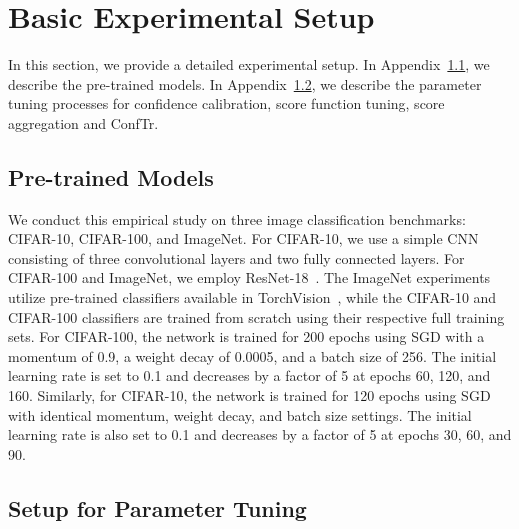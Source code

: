 \documentclass{article}
\newcommand{\1}{\mathbbm{1}}
\theoremstyle{plain}
\theoremstyle{definition}
\theoremstyle{remark}
\begin{document}
\section{Basic Experimental Setup}
\label{sec:basic_experimental_setup}
In this section, we provide a detailed experimental setup. In Appendix~\ref{subsec:pre-trained_models}, we describe the pre-trained models. In Appendix~\ref{subsec:parameter_tuning}, we describe the parameter tuning processes for confidence calibration, score function tuning, score aggregation and ConfTr.  

\subsection{Pre-trained Models}
\label{subsec:pre-trained_models}
We conduct this empirical study on three image classification benchmarks: CIFAR-10, CIFAR-100, and ImageNet. 
For CIFAR-10, we use a simple CNN consisting of three convolutional layers and two fully connected layers. 
For CIFAR-100 and ImageNet, we employ ResNet-18~\citep{he2016deep}. 
The ImageNet experiments utilize pre-trained classifiers available in TorchVision~\citep{paszke2019pytorch}, while the CIFAR-10 and CIFAR-100 classifiers are trained from scratch using their respective full training sets. 
For CIFAR-100, the network is trained for 200 epochs using SGD with a momentum of 0.9, a weight decay of 0.0005, and a batch size of 256. 
The initial learning rate is set to 0.1 and decreases by a factor of 5 at epochs 60, 120, and 160. 
Similarly, for CIFAR-10, the network is trained for 120 epochs using SGD with identical momentum, weight decay, and batch size settings. The initial learning rate is also set to 0.1 and decreases by a factor of 5 at epochs 30, 60, and 90.


\subsection{Setup for Parameter Tuning}
\label{subsec:parameter_tuning}
\end{document}
